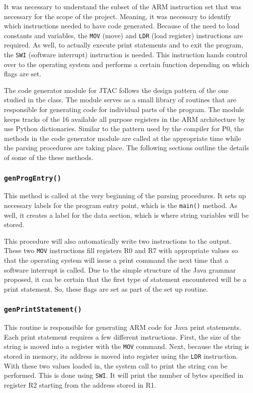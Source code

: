 \documentclass[11pt]{article}
\begin{document}
\bigskip
It was necessary to understand the subset of the ARM instruction set that was necessary for the scope of the project. Meaning, it was necessary to identify which instructions needed to have code generated. Because of the need to load constants and variables, the {\tt MOV} (move) and {\tt LDR} (load register) instructions are required. As well, to actually execute print statements and to exit the program, the {\tt SWI} (software interrupt) instruction is needed. This instruction hands control over to the operating system and performs a certain function depending on which flags are set. 

\bigskip
The code generator module for JTAC follows the design pattern of the one studied in the class. The module serves as a small library of routines that are responsible for generating code for individual parts of the program. The module keeps tracks of the 16 available all purpose registers in the ARM architecture by use Python dictionaries. Similar to the pattern used by the compiler for P0, the methods in the code generator module are called at the appropriate time while the parsing procedures are taking place. The following sections outline the details of some of the these methods. 

\subsubsection{{\tt genProgEntry()}}

This method is called at the very beginning of the parsing procedures. It sets up necessary labels for the program entry point, which is the {\tt main()} method. As well, it creates a label for the data section, which is where string variables will be stored. 

\bigskip
This procedure will also automatically write two instructions to the output. These two {\tt MOV} instructions fill registers R0 and R7 with appropriate values so that the operating system will issue a print command the next time that a software interrupt is called. Due to the simple structure of the Java grammar proposed, it can be certain that the first type of statement encountered will be a print statement. So, these flags are set as part of the set up routine. 

\subsubsection{{\tt genPrintStatement()}} 

This routine is responsible for generating ARM code for Java print statements. Each print statement requires a few different instructions. First, the size of the string is moved into a register with the {\tt MOV} command. Next, because the string is stored in memory, its address is moved into register using the {\tt LDR} instruction. With these two values loaded in, the system call to print the string can be performed. This is done using {\tt SWI}. It will print the number of bytes specified in register R2 starting from the address stored in R1. 
\end{document}
